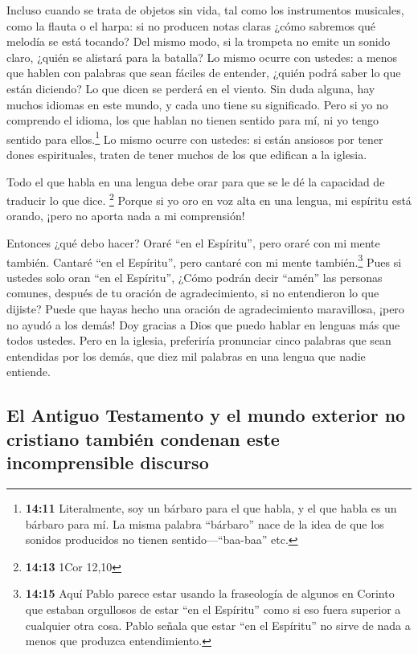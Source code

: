  Incluso cuando se trata de objetos sin vida, tal como los
instrumentos musicales, como la flauta o el harpa: si no producen notas
claras ¿cómo sabremos qué melodía se está tocando?  Del
mismo modo, si la trompeta no emite un sonido claro, ¿quién se alistará
para la batalla?  Lo mismo ocurre con ustedes: a menos que
hablen con palabras que sean fáciles de entender, ¿quién podrá saber lo
que están diciendo? Lo que dicen se perderá en el viento.
 Sin duda alguna, hay muchos idiomas en este mundo, y
cada uno tiene su significado.  Pero si yo no comprendo
el idioma, los que hablan no tienen sentido para mí, ni yo tengo sentido
para ellos.\footnote{\textbf{14:11} Literalmente, soy un bárbaro para el
  que habla, y el que habla es un bárbaro para mí. La misma palabra
  ``bárbaro'' nace de la idea de que los sonidos producidos no tienen
  sentido---``baa-baa'' etc.}  Lo mismo ocurre con
ustedes: si están ansiosos por tener dones espirituales, traten de tener
muchos de los que edifican a la iglesia.

 Todo el que habla en una lengua debe orar para que se le
dé la capacidad de traducir lo que dice. \footnote{\textbf{14:13} 1Cor
  12,10}  Porque si yo oro en voz alta en una lengua, mi
espíritu está orando, ¡pero no aporta nada a mi comprensión!

 Entonces ¿qué debo hacer? Oraré ``en el Espíritu'', pero
oraré con mi mente también. Cantaré ``en el Espíritu'', pero cantaré con
mi mente también.\footnote{\textbf{14:15} Aquí Pablo parece estar usando
  la fraseología de algunos en Corinto que estaban orgullosos de estar
  ``en el Espíritu'' como si eso fuera superior a cualquier otra cosa.
  Pablo señala que estar ``en el Espíritu'' no sirve de nada a menos que
  produzca entendimiento.}  Pues si ustedes solo oran
``en el Espíritu'', ¿Cómo podrán decir ``amén'' las personas comunes,
después de tu oración de agradecimiento, si no entendieron lo que
dijiste?  Puede que hayas hecho una oración de
agradecimiento maravillosa, ¡pero no ayudó a los demás! 
Doy gracias a Dios que puedo hablar en lenguas más que todos ustedes.
 Pero en la iglesia, preferiría pronunciar cinco palabras
que sean entendidas por los demás, que diez mil palabras en una lengua
que nadie entiende.

\hypertarget{el-antiguo-testamento-y-el-mundo-exterior-no-cristiano-tambiuxe9n-condenan-este-incomprensible-discurso}{%
\subsection{El Antiguo Testamento y el mundo exterior no cristiano
también condenan este incomprensible
discurso}\label{el-antiguo-testamento-y-el-mundo-exterior-no-cristiano-tambiuxe9n-condenan-este-incomprensible-discurso}}

